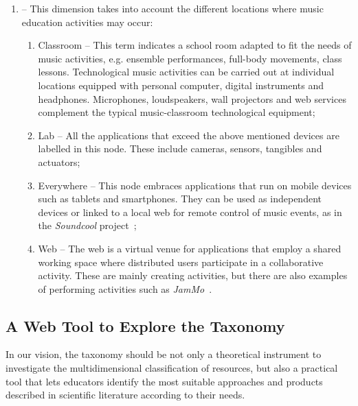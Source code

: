 \documentclass[10pt,journal,compsoc]{IEEEtran}
\newcommand{\dimension}[1]{{\fontfamily{cmss}\selectfont {\textit{#1}}}}
\newcommand{\node}[1]{{\fontfamily{cmss}\selectfont #1}}
\begin{document}
\begin{enumerate}[label=3.\arabic*.,leftmargin=0.7cm,listparindent=-\leftmargin, start=0]
\item \dimension{Venues} -- This dimension takes into account the different locations where music education activities may occur:

\begin{enumerate}[label=3.2.\arabic*.,leftmargin=0.9cm,listparindent=-\leftmargin, start=0]

\item \node{Classroom} -- This term indicates a school room adapted to fit the needs of music activities, e.g. ensemble performances, full-body movements, class lessons. Technological music activities can be carried out at individual locations equipped with personal computer, digital instruments and headphones. Microphones, loudspeakers, wall projectors and web services complement the typical music-classroom technological equipment;

\item \node{Lab} -- All the applications that exceed the above mentioned devices are labelled in this node. These include cameras, sensors, tangibles and actuators;

\item \node{Everywhere} -- This node embraces applications that run on mobile devices such as tablets and smartphones. They can be used as independent devices or linked to a local web for remote control of music events, as in the \textit{Soundcool} project~\cite{roble};

\item \node{Web} -- The web is a virtual venue for applications that employ a shared working space where distributed users participate in a collaborative activity. These are mainly creating activities, but there are also examples of performing activities such as \textit{JamMo}~\cite{paananen2009jammo}.

\end{enumerate}

\end{enumerate}


\subsection{A Web Tool to Explore the Taxonomy}
\label{subsec:exploring}

In our vision, the taxonomy should be not only a theoretical instrument to investigate the multidimensional classification of resources, but also a practical tool that lets educators identify the most suitable approaches and products described in scientific literature according to their needs.
\end{document}
